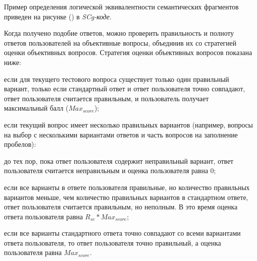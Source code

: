 Пример определения логической эквивалентности семантических фрагментов приведен на рисунке (\textit{}) в \textit{SCg-коде}. 

Когда получено подобие ответов, можно проверить правильность и полноту ответов пользователей на объективные вопросы, объединив их со стратегией оценки объективных вопросов. Стратегия оценки объективных вопросов показана ниже:

\begin{textitemize}
	\item если для текущего тестового вопроса существует только один правильный вариант, только если стандартный ответ и ответ пользователя точно совпадают, ответ пользователя считается правильным, и пользователь получает максимальный балл ($Max_{score}$);
	
	\item если текущий вопрос имеет несколько правильных вариантов (например, вопросы на выбор с несколькими вариантами ответов и часть вопросов на заполнение пробелов):
	
	\begin{textitemize}
		\item до тех пор, пока ответ пользователя содержит неправильный вариант, ответ пользователя считается неправильным и оценка пользователя равна 0;
		
		\item если все варианты в ответе пользователя правильные, но количество правильных вариантов меньше, чем количество правильных вариантов в стандартном ответе, ответ пользователя считается правильным, но неполным. В это время оценка ответа пользователя равна $R_{sc}*Max_{score}$;
		
		\item если все варианты стандартного ответа точно совпадают со всеми вариантами ответа пользователя, то ответ пользователя точно правильный, а оценка пользователя равна $Max_{score}$. 	
		
	\end{textitemize}
	
\end{textitemize}

